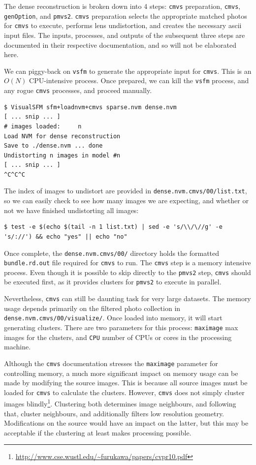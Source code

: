 The dense reconstruction is broken down into 4 steps: {\tt cmvs} preparation, {\tt cmvs}, {\tt genOption}, and {\tt pmvs2}. {\tt cmvs} preparation selects the appropriate matched photos for {\tt cmvs} to execute, performs lens undistortion, and creates the necessary ascii input files. The inputs, processes, and outputs of the subsequent three steps are documented in their respective documentation, and so will not be elaborated here.

We can piggy-back on {\tt vsfm} to generate the appropriate input for {\tt cmvs}. This is an $O(N)$ CPU-intensive process. Once prepared, we can kill the {\tt vsfm} process, and any rogue {\tt cmvs} processes, and proceed manually.

\begin{lstlisting}
$ VisualSFM sfm+loadnvm+cmvs sparse.nvm dense.nvm
[ ... snip ... ]
# images loaded:     n
Load NVM for dense reconstruction
Save to ./dense.nvm ... done
Undistorting n images in model #n
[ ... snip ... ]
^C^C^C
\end{lstlisting}

The index of images to undistort are provided in {\tt dense.nvm.cmvs/00/list.txt}, so we can easily check to see how many images we are expecting, and whether or not we have finished undistorting all images:

\begin{lstlisting}
$ test -e $(echo $(tail -n 1 list.txt) | sed -e 's/\\/\//g' -e 's/://') && echo "yes" || echo "no"
\end{lstlisting}

Once complete, the {\tt dense.nvm.cmvs/00/} directory holds the formatted {\tt bundle.rd.out} file required for {\tt cmvs} to run. The {\tt cmvs} step is a memory intensive process. Even though it is possible to skip directly to the {\tt pmvs2} step, {\tt cmvs} should be executed first, as it provides clusters for {\tt pmvs2} to execute in parallel.

Nevertheless, {\tt cmvs} can still be daunting task for very large datasets. The memory usage depends primarily on the filtered photo collection in {\tt dense.nvm.cmvs/00/visualize/}. Once loaded into memory, it will start generating clusters. There are two parameters for this process: {\tt maximage} max images for the clusters, and {\tt CPU} number of CPUs or cores in the processing machine.

Although the {\tt cmvs} documentation stresses the {\tt maximage} parameter for controlling memory, a much more significant impact on memory usage can be made by modifying the source images. This is because all source images must be loaded for {\tt cmvs} to calculate the clusters. However, {\tt cmvs} does not simply cluster images blindly\footnote{\url{http://www.cse.wustl.edu/~furukawa/papers/cvpr10.pdf}}. Clustering both determines image neighbours, and following that, cluster neighbours, and additionally filters low resolution geometry. Modifications on the source would have an impact on the latter, but this may be acceptable if the clustering at least makes processing possible.

